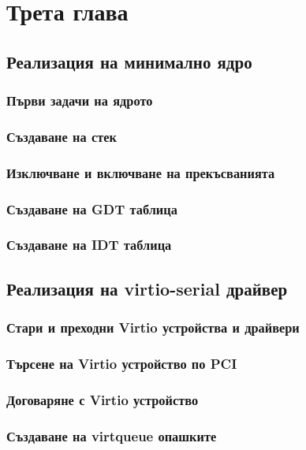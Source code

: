 \chapter{Трета глава} %
\section{Реализация на минимално ядро}
  \subsection{Първи задачи на ядрото}

  \subsection{Създаване на стек}

  \subsection{Изключване и включване на прекъсванията}

  \subsection{Създаване на GDT таблица}

  \subsection{Създаване на IDT таблица}

\section{Реализация на virtio-serial драйвер}
  \subsection{Стари и преходни Virtio устройства и драйвери}

  \subsection{Търсене на Virtio устройство по PCI}

  \subsection{Договаряне с Virtio устройство}

  \subsection{Създаване на virtqueue опашките}

